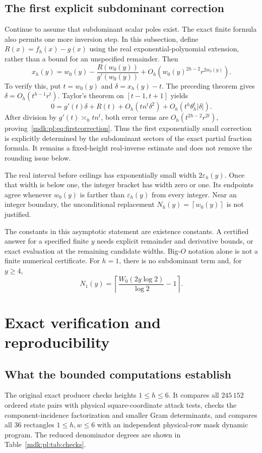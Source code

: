\documentclass[11pt,letterpaper]{article}
\numberwithin{equation}{section}
\theoremstyle{remark}\newtheorem{remark}[theorem]{Remark}
\newcommand{\ceil}[1]{\left\lceil #1\right\rceil}
\begin{document}
\subsection{The first explicit subdominant correction}
Continue to assume that subdominant scalar poles exist. The exact finite formula also permits one more inversion step. In this subsection, define $R(x)=f_h(x)-g(x)$ using the real exponential-polynomial extension, rather than a bound for an unspecified remainder. Then
\begin{equation}\label{mdk:pl:eq:firstcorrection}
 x_h(y)=w_0(y)-\frac{R(w_0(y))}{g'(w_0(y))}
 +O_h\!\left(w_0(y)^{2h-2}r^{2w_0(y)}\right).
\end{equation}
To verify this, put $t=w_0(y)$ and $\delta=x_h(y)-t$. The preceding theorem gives $\delta=O_h(t^{h-1}r^t)$. Taylor's theorem on $[t-1,t+1]$ yields
\[
 0=g'(t)\delta+R(t)
   +O_h(tn^t\delta^2)+O_h(t^h\theta_h^t|\delta|).
\]
After division by $g'(t)\asymp_h tn^t$, both error terms are
$O_h(t^{2h-2}r^{2t})$, proving~\eqref{mdk:pl:eq:firstcorrection}. Thus the first exponentially small correction is explicitly determined by the subdominant sectors of the exact partial fraction formula. It remains a fixed-height real-inverse estimate and does not remove the rounding issue below.

The real interval before ceilings has exponentially small width $2\varepsilon_h(y)$. Once that width is below one, the integer bracket has width zero or one. Its endpoints agree whenever $w_0(y)$ is farther than $\varepsilon_h(y)$ from every integer. Near an integer boundary, the unconditional replacement $N_h(y)=\ceil{w_0(y)}$ is not justified.

The constants in this asymptotic statement are existence constants. A certified answer for a specified finite $y$ needs explicit remainder and derivative bounds, or exact evaluation at the remaining candidate widths. Big-$O$ notation alone is not a finite numerical certificate. For $h=1$, there is no subdominant term and, for $y\ge4$,
\[
 N_1(y)=\ceil{\frac{W_0(2y\log2)}{\log2}-1}.
\]

\section{Exact verification and reproducibility}\label{mdk:pl:sec:verification}
\subsection{What the bounded computations establish}
The original exact producer checks heights $1\le h\le6$. It compares all $245\,152$ ordered state pairs with physical square-coordinate attack tests, checks the component-incidence factorization and smaller Gram determinants, and compares all 36 rectangles $1\le h,w\le6$ with an independent physical-row mask dynamic program. The reduced denominator degrees are shown in Table~\ref{mdk:pl:tab:checks}.
\end{document}

